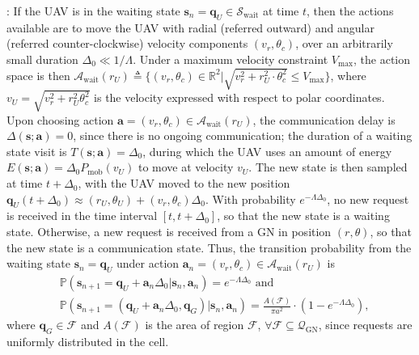 \documentclass[10pt,twocolumn]{IEEEtran}
\begin{document}
: If the UAV is in the waiting state $\mathbf{s}_{n}{=}\mathbf{q}_{U}{\in}\mathcal{S}_{\mathrm{wait}}$ at time $t$, then the actions available are to move the UAV with radial (referred outward) and angular (referred counter-clockwise) velocity components $(v_{r},\theta_{c})$, over an arbitrarily small duration $\Delta_{0}{\ll}1/\Lambda$. Under a maximum velocity constraint $V_{\mathrm{max}}$, the action space is then $\mathcal{A}_{\mathrm{wait}}(r_{U}){\triangleq}\Big\{(v_{r},\theta_{c}){\in}\mathbb{R}^{2}\Big|\sqrt{v_{r}^{2}{+}r_{U}^{2}{\cdot}\theta_{c}^{2}}{\leq}V_{\mathrm{max}}\Big\}$, where $v_{U}{=}\sqrt{v_{r}^{2}{+}r_{U}^{2}\theta_{c}^{2}}$ is the velocity expressed with respect to polar coordinates. Upon choosing action $\mathbf{a}{=}(v_{r},\theta_{c}){\in}\mathcal{A}_{\mathrm{wait}}(r_{U})$, the communication delay is $\Delta(\mathbf{s};\mathbf{a}){=}0$, since there is no ongoing communication; the duration of a waiting state visit is $T(\mathbf{s};\mathbf{a}){=}\Delta_{0}$, during which the UAV uses an amount of energy $E(\mathbf{s};\mathbf{a}){=}\Delta_{0}P_{\mathrm{mob}} \left(v_{U}\right)$ to move at velocity $v_{U}$. The new state is then sampled at time $t{+}\Delta_{0}$, with the UAV moved to the new position $\mathbf{q}_{U}(t{+}\Delta_{0}){\approx}(r_{U},\theta_{U}){+}(v_{r},\theta_{c})\Delta_{0}$. With probability $e^{-\Lambda \Delta_{0}}$, no new request is received in the time interval $[t,t{+}\Delta_{0}]$, so that the new state is a waiting state.  Otherwise, a new request is received from a GN in position $(r,\theta)$, so that the new state is a communication state. Thus, the transition probability from the waiting state $\mathbf{s}_{n}{=}\mathbf{q}_{U}$ under action $\mathbf{a}_{n}{=}(v_{r},\theta_{c}){\in}\mathcal{A}_{\mathrm{wait}}(r_{U})$ is 
\begin{align}\label{eq:R0ContTrProb}
    &\mathbb{P}(\mathbf{s}_{n+1}{=}\mathbf{q}_{U}{+}\mathbf a_{n}\Delta_{0}{|}\mathbf{s}_{n},\mathbf{a}_{n}){=}e^{-\Lambda \Delta_{0}}\text{ and }\\
    &\mathbb{P}(\mathbf{s}_{n{+}1}{=}(\mathbf{q}_{U}{+}\mathbf{a}_{n}\Delta_{0},\mathbf{q}_{G})|\mathbf{s}_{n},\mathbf{a}_{n}){=}\frac{A(\mathcal{F})}{\pi a^{2}}{\cdot}(1{-}e^{-\Lambda\Delta_{0}}),\nonumber
\end{align}
where $\mathbf{q}_{G}{\in}\mathcal{F}$ and $A(\mathcal{F})$ is the area of region $\mathcal{F}$, ${\forall}\mathcal{F}{\subseteq}\mathcal{Q}_{\mathrm{GN}}$, since requests are uniformly distributed in the cell.\\
\end{document}
